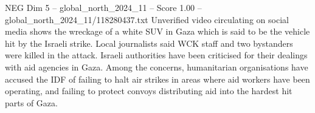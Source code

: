 \begin{textsample}{NEG Dim 5 – global\_north\_2024\_11 – Score 1.00 – global\_north\_2024\_11/118280437.txt}
Unverified video circulating on social media shows the wreckage of a white SUV in Gaza which is said to be the vehicle hit by the Israeli strike.
Local journalists said WCK staff and two bystanders were killed in the attack.
Israeli authorities have been criticised for their dealings with aid agencies in Gaza.
Among the concerns, humanitarian organisations have accused the IDF of failing to halt air strikes in areas where aid workers have been operating, and failing to protect convoys distributing aid into the hardest hit parts of Gaza.

\end{textsample}
